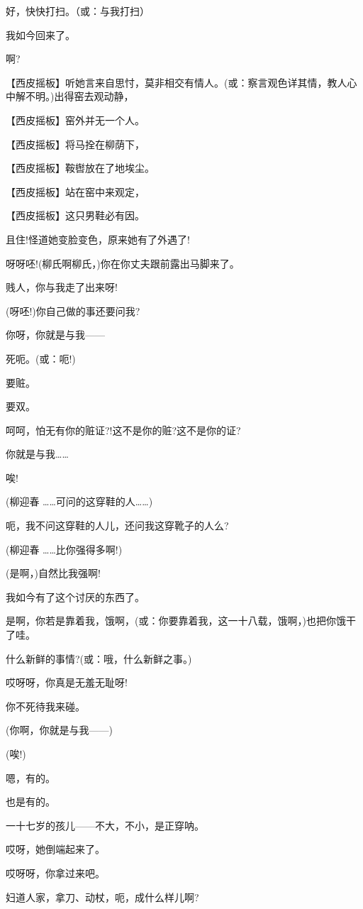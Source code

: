 好，快快打扫。（或：与我打扫）

我如今回来了。

啊?

【西皮摇板】听她言来自思忖，莫非相交有情人。(或：察言观色详其情，教人心中解不明。)出得窑去观动静，

【西皮摇板】窑外并无一个人。

【西皮摇板】将马拴在柳荫下，

【西皮摇板】鞍辔放在了地埃尘。

【西皮摇板】站在窑中来观定，

【西皮摇板】这只男鞋必有因。

且住!怪道她变脸变色，原来她有了外遇了!

呀呀呸!(柳氏啊柳氏，)你在你丈夫跟前露出马脚来了。

贱人，你与我走了出来呀!

(呀呸!)你自己做的事还要问我?

你呀，你就是与我------

死呃。(或：呃!)

要赃。

要双。

呵呵，怕无有你的赃证?!这不是你的赃?这不是你的证?

你就是与我\ldots{}\ldots{}

唉!

(柳迎春 \ldots{}\ldots{}可问的这穿鞋的人\ldots{}\ldots{})

呃，我不问这穿鞋的人儿，还问我这穿靴子的人么?

(柳迎春 \ldots{}\ldots{}比你强得多啊!)

(是啊，)自然比我强啊!

我如今有了这个讨厌的东西了。

是啊，你若是靠着我，饿啊，(或：你要靠着我，这一十八载，饿啊，)也把你饿干了哇。

什么新鲜的事情?(或：哦，什么新鲜之事。)

哎呀呀，你真是无羞无耻呀!

你不死待我来碰。

(你啊，你就是与我------)

(唉!)

嗯，有的。

也是有的。

一十七岁的孩儿------不大，不小，是正穿呐。

哎呀，她倒端起来了。

哎呀呀，你拿过来吧。

妇道人家，拿刀、动杖，呃，成什么样儿啊?

